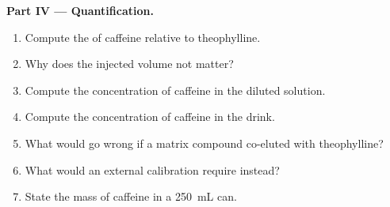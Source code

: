 \begin{problem}
\medskip
\noindent\textbf{Part IV --- Quantification.}
\begin{enumerate}[resume]
  \item Compute the  of caffeine relative to theophylline.
  \item Why does the injected volume not matter?
  \item Compute the concentration of caffeine in the diluted solution.
  \item Compute the concentration of caffeine in the drink.
  \item What would go wrong if a matrix compound co-eluted with theophylline?
  \item What would an external calibration require instead?
  \item State the mass of caffeine in a \qty{250}{mL} can.
\end{enumerate}
\end{problem}
